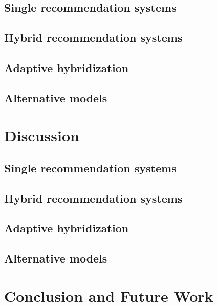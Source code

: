 \documentclass[10pt]{reportMaster}
\begin{document}
\section{Single recommendation systems}

\section{Hybrid recommendation systems}

\section{Adaptive hybridization}

\section{Alternative models}







\chapter{Discussion}

\section{Single recommendation systems}

\section{Hybrid recommendation systems}

\section{Adaptive hybridization}

\section{Alternative models}







\chapter{Conclusion and Future Work}











\end{document}
